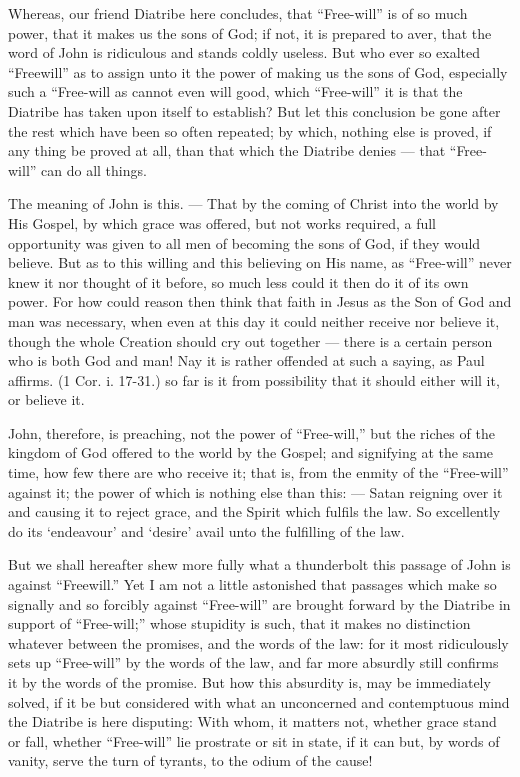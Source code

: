 Whereas, our friend Diatribe here concludes, that “Free-will” is of so much power, that it makes us the sons of God; if not, it is prepared to aver, that the word of John is ridiculous and stands coldly useless. But who ever so exalted “Freewill” as to assign unto it the power of making us the sons of God, especially such a “Free-will as cannot even will good, which “Free-will” it is that the Diatribe has taken upon itself to establish? But let this conclusion be gone after the rest which have been so often repeated; by which, nothing else is proved, if any thing be proved at all, than that which the Diatribe denies — that “Free-will” can do all things.

The meaning of John is this. — That by the coming of Christ into the world by His Gospel, by which grace was offered, but not works required, a full opportunity was given to all men of becoming the sons of God, if they would believe. But as to this willing and this believing on His name, as “Free-will” never knew it nor thought of it before, so much less could it then do it of its own power. For how could reason then think that faith in Jesus as the Son of God and man was necessary, when even at this day it could neither receive nor believe it, though the whole Creation should cry out together — there is a certain person who is both God and man! Nay it is rather offended at such a saying, as Paul affirms. (1 Cor. i. 17-31.) so far is it from possibility that it should either will it, or believe it.

John, therefore, is preaching, not the power of “Free-will,” but the riches of the kingdom of God offered to the world by the Gospel; and signifying at the same time, how few there are who receive it; that is, from the enmity of the “Free-will” against it; the power of which is nothing else than this: — Satan reigning over it and causing it to reject grace, and the Spirit which fulfils the law. So excellently do its ‘endeavour’ and ‘desire’ avail unto the fulfilling of the law.

But we shall hereafter shew more fully what a thunderbolt this passage of John is against “Freewill.” Yet I am not a little astonished that passages which make so signally and so forcibly against “Free-will” are brought forward by the Diatribe in support of “Free-will;” whose stupidity is such, that it makes no distinction whatever between the promises, and the words of the law: for it most ridiculously sets up “Free-will” by the words of the law, and far more absurdly still confirms it by the words of the promise. But how this absurdity is, may be immediately solved, if it be but considered with what an unconcerned and contemptuous mind the Diatribe is here disputing: With whom, it matters not, whether grace stand or fall, whether “Free-will” lie prostrate or sit in state, if it can but, by words of vanity, serve the turn of tyrants, to the odium of the cause!

